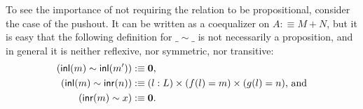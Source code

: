 To see the importance of not requiring the relation to be propositional,
consider the case of the pushout.
It can be written as a coequalizer on $A :\equiv M + N$, but it is easy that the
following definition for $\_\sim\_$ is not necessarily a proposition,
and in general it is neither reflexive, nor symmetric, nor transitive:
\begin{align*}
(\mathsf{inl}(m) \sim \mathsf{inl}(m')) &:\equiv \mathbf{0} \text{,} \\
(\mathsf{inl}(m) \sim \mathsf{inr}(n)) &:\equiv (l : L) \times (f(l) = m) \times (g(l) = n) \text{, and} \\
(\mathsf{inr}(m) \sim x) &:\equiv  \mathbf{0} \text{.}
\end{align*}



















